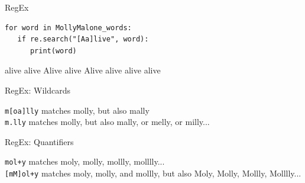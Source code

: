 \documentclass[handout]{beamer}
\begin{document}
\begin{frame}[fragile]{RegEx}

\begin{lstlisting}
for word in MollyMalone_words:
   if re.search("[Aa]live", word):
      print(word)
\end{lstlisting}
	
\begin{lstlistingoutput}
alive
alive
Alive
alive
Alive
alive
alive
alive
\end{lstlistingoutput}
	
	
\end{frame}



\begin{frame}[fragile]{RegEx: Wildcards}

\lstinline{m[oa]lly} matches molly, but also mally \\
\lstinline{m.lly} matches molly, but also mally, or melly, or milly...

	
	
\end{frame}


\begin{frame}[fragile]{RegEx: Quantifiers}
	
\lstinline{mol+y} matches moly, molly, mollly, molllly...  \\
\lstinline{[mM]ol+y} matches moly, molly, and mollly, but also Moly, Molly, Mollly, Molllly... 
	
	
	
\end{frame}
\end{document}
